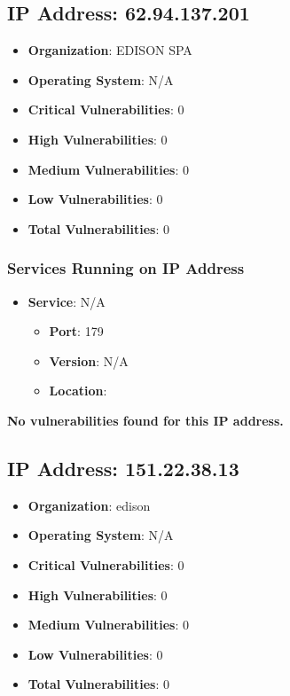 \documentclass{article}
\begin{document}
\clearpage



\subsection*{IP Address: 62.94.137.201}

\begin{itemize}
    \item \textbf{Organization}: EDISON SPA
    \item \textbf{Operating System}:  N/A 
    \item \textbf{Critical Vulnerabilities}: 0
    \item \textbf{High Vulnerabilities}: 0
    \item \textbf{Medium Vulnerabilities}: 0
    \item \textbf{Low Vulnerabilities}: 0
    \item \textbf{Total Vulnerabilities}: 0
\end{itemize}

\subsubsection*{Services Running on IP Address}

\begin{itemize}
    
        \item \textbf{Service}: N/A
        \begin{itemize}
            \item \textbf{Port}: 179
            \item \textbf{Version}:  N/A 
            \item \textbf{Location}: \href{  }{  }
        \end{itemize}
    
\end{itemize}


\textbf{No vulnerabilities found for this IP address.}




\clearpage



\subsection*{IP Address: 151.22.38.13}

\begin{itemize}
    \item \textbf{Organization}: edison
    \item \textbf{Operating System}:  N/A 
    \item \textbf{Critical Vulnerabilities}: 0
    \item \textbf{High Vulnerabilities}: 0
    \item \textbf{Medium Vulnerabilities}: 0
    \item \textbf{Low Vulnerabilities}: 0
    \item \textbf{Total Vulnerabilities}: 0
\end{itemize}
\end{document}
